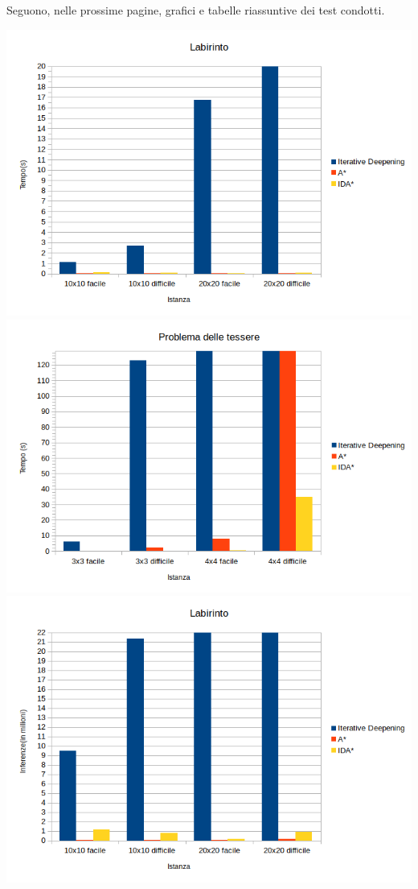 \documentclass[a4paper,oneside,12pt]{book}
\begin{document}
    Seguono, nelle prossime pagine, grafici e tabelle riassuntive dei test condotti.

    \begin{center}
        \includegraphics[height=0.70\textwidth	]{labirintoTempo}
        \includegraphics[height=0.70\textwidth]{tessereTempo}
        \includegraphics[height=0.70\textwidth]{labirintoInferenze}


\end{center}
\end{document}
